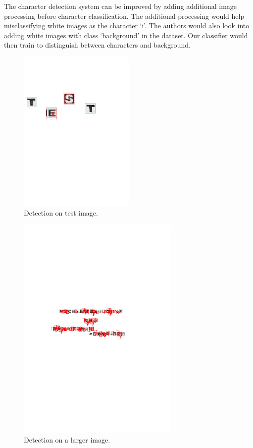 \documentclass[../main.tex]{subfiles}
\begin{document}
The character detection system can be improved by adding additional image
processing before character classification. The additional processing would help
misclassifying white images as the character `i'. The authors would also look
into adding white images with class `background' in the dataset. Our classifier
would then train to distinguish between characters and background.

\clearpage
\begin{figure}[t!]
  \hspace{3.9cm}\includegraphics[trim={4cm, 18cm, 4cm, 14cm},width=0.5\textwidth]{figures/character_detection/detection_2.pdf}
  \caption{Detection on test image.}
  \label{fig:detection_small}
\end{figure}

\begin{figure}
  \hspace*{2.4cm}\includegraphics[trim={4cm, 14cm, 4cm, 10cm},width=0.7\textwidth]{figures/character_detection/detection_1.pdf}
  \caption{Detection on a larger image.}
  \label{fig:detection_large}
\end{figure}
\end{document}

